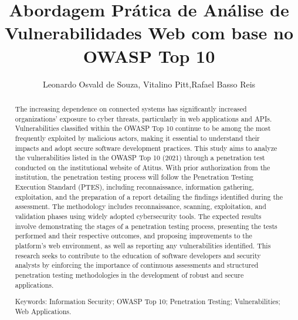 \documentclass[12pt]{article}
\title{Abordagem Prática de Análise de Vulnerabilidades Web com base no OWASP Top 10 } %
\author{Leonardo Osvald de Souza\inst{1}, Vitalino Pitt\inst{1},Rafael Basso Reis\inst{1}} %
\begin{document}
\maketitle %

\begin{abstract} %
  The increasing dependence on connected systems has significantly increased organizations' exposure to cyber threats, particularly in web applications and APIs. 
  Vulnerabilities classified within the OWASP Top 10 continue to be among the most frequently exploited by malicious actors, making it essential to understand their 
  impacts and adopt secure software development practices. This study aims to analyze the vulnerabilities listed in the OWASP Top 10 (2021) through a penetration test 
  conducted on the institutional website of Atitus. With prior authorization from the institution, the penetration testing process will follow the Penetration Testing 
  Execution Standard (PTES), including reconnaissance, information gathering, exploitation, and the preparation of a report detailing the findings identified during the 
  assessment. The methodology includes reconnaissance, scanning, exploitation, and validation phases using widely adopted cybersecurity tools. The expected results involve 
  demonstrating the stages of a penetration testing process, presenting the tests performed and their respective outcomes, and proposing improvements to the platform's web 
  environment, as well as reporting any vulnerabilities identified. This research seeks to contribute to the education of software developers and security analysts by 
  einforcing the importance of continuous assessments and structured penetration testing methodologies in the development of robust and secure applications.

Keywords: Information Security; OWASP Top 10; Penetration Testing; Vulnerabilities; Web Applications.
\end{abstract}
     
\end{document}
